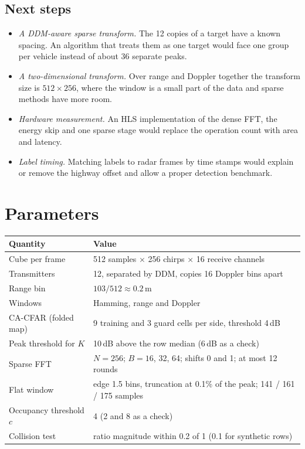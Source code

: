 \documentclass[10pt,a4paper]{article}
\begin{document}
\subsection{Next steps}
\begin{itemize}
\item \emph{A DDM-aware sparse transform.} The 12 copies of a target have a known spacing. An algorithm that treats them as one target would face one group per vehicle instead of about 36 separate peaks.
\item \emph{A two-dimensional transform.} Over range and Doppler together the transform size is $512 \times 256$, where the window is a small part of the data and sparse methods have more room.
\item \emph{Hardware measurement.} An HLS implementation of the dense FFT, the energy skip and one sparse stage would replace the operation count with area and latency.
\item \emph{Label timing.} Matching labels to radar frames by time stamps would explain or remove the highway offset and allow a proper detection benchmark.
\end{itemize}

\appendix
\section{Parameters}
\begin{table}[h]
\centering
\begin{tabular}{ll}
\toprule
Quantity & Value \\
\midrule
Cube per frame & 512 samples $\times$ 256 chirps $\times$ 16 receive channels \\
Transmitters & 12, separated by DDM, copies 16 Doppler bins apart \\
Range bin & $103/512 \approx 0.2$\,m \\
Windows & Hamming, range and Doppler \\
CA-CFAR (folded map) & 9 training and 3 guard cells per side, threshold 4\,dB \\
Peak threshold for $K$ & 10\,dB above the row median (6\,dB as a check) \\
Sparse FFT & $N = 256$; $B = 16$, 32, 64; shifts 0 and 1; at most 12 rounds \\
Flat window & edge 1.5 bins, truncation at 0.1\% of the peak; 141 / 161 / 175 samples \\
Occupancy threshold $c$ & 4 (2 and 8 as a check) \\
Collision test & ratio magnitude within 0.2 of 1 (0.1 for synthetic rows) \\
\bottomrule
\end{tabular}
\end{table}
\end{document}

